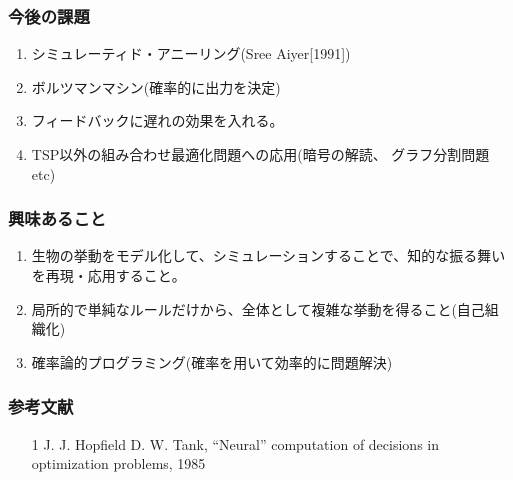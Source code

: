 \documentclass[dvipdfmx,11pt,notheorems]{beamer}
\theoremstyle{definition}
\begin{document}

\begin{frame}\frametitle{今後の課題}
\Large{
\begin{enumerate}
\item シミュレーティド・アニーリング(Sree Aiyer[1991])
\vspace{1.0cm}
\item ボルツマンマシン(確率的に出力を決定)
\vspace{1.0cm}
\item フィードバックに遅れの効果を入れる。
\vspace{1.0cm}
\item TSP以外の組み合わせ最適化問題への応用(暗号の解読、 グラフ分割問題etc)
\end{enumerate}
}
\end{frame}

\begin{frame}\frametitle{興味あること}
\Large{
\begin{enumerate}
\item 生物の挙動をモデル化して、シミュレーションすることで、知的な振る舞いを再現・応用すること。
\vspace{1.0cm}
\item 局所的で単純なルールだけから、全体として複雑な挙動を得ること(自己組織化)
\vspace{1.0cm}
\item 確率論的プログラミング(確率を用いて効率的に問題解決)
\end{enumerate}
}
\end{frame}

\begin{frame}\frametitle{参考文献}
\begin{enumerate}
\item[1] J. J. Hopfield D. W. Tank, “Neural” computation of decisions in optimization problems, 1985 
\end{enumerate}
\end{frame}
\end{document}
